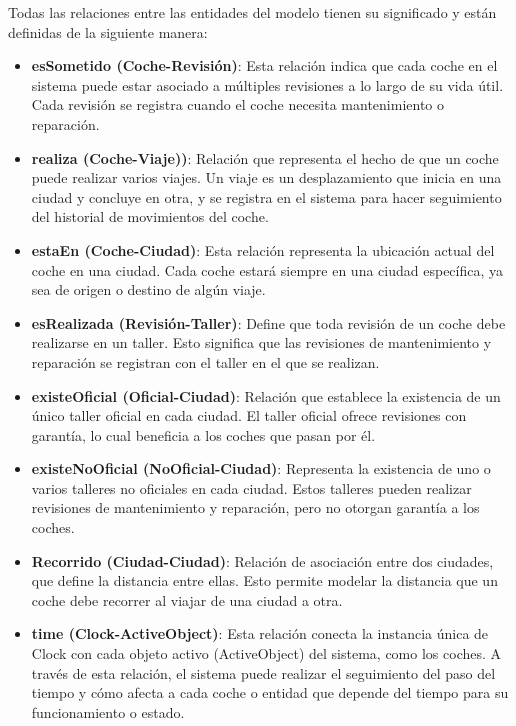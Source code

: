 \documentclass[12pt.a4paper]{article}
\begin{document}
Todas las relaciones entre las entidades del modelo tienen su significado y están definidas de la siguiente manera:
\begin{itemize}
\item \textbf{esSometido (Coche-Revisión)}:  Esta relación indica que cada coche en el sistema puede estar asociado a múltiples revisiones a lo largo de su vida útil. Cada revisión se registra cuando el coche necesita mantenimiento o reparación.
  
\item \textbf{realiza (Coche-Viaje))}: Relación que representa el hecho de que un coche puede realizar varios viajes. Un viaje es un desplazamiento que inicia en una ciudad y concluye en otra, y se registra en el sistema para hacer seguimiento del historial de movimientos del coche.

\item \textbf{estaEn (Coche-Ciudad)}: Esta relación representa la ubicación actual del coche en una ciudad. Cada coche estará siempre en una ciudad específica, ya sea de origen o destino de algún viaje.

\item \textbf{esRealizada (Revisión-Taller)}: Define que toda revisión de un coche debe realizarse en un taller. Esto significa que las revisiones de mantenimiento y reparación se registran con el taller en el que se realizan.

\item \textbf{existeOficial (Oficial-Ciudad)}: Relación que establece la existencia de un único taller oficial en cada ciudad. El taller oficial ofrece revisiones con garantía, lo cual beneficia a los coches que pasan por él.

\item \textbf{existeNoOficial (NoOficial-Ciudad)}: Representa la existencia de uno o varios talleres no oficiales en cada ciudad. Estos talleres pueden realizar revisiones de mantenimiento y reparación, pero no otorgan garantía a los coches.

\item \textbf{Recorrido (Ciudad-Ciudad)}: Relación de asociación entre dos ciudades, que define la distancia entre ellas. Esto permite modelar la distancia que un coche debe recorrer al viajar de una ciudad a otra.

\item \textbf{time (Clock-ActiveObject)}: Esta relación conecta la instancia única de Clock con cada objeto activo (ActiveObject) del sistema, como los coches. A través de esta relación, el sistema puede realizar el seguimiento del paso del tiempo y cómo afecta a cada coche o entidad que depende del tiempo para su funcionamiento o estado.
\end{itemize}
\end{document}
